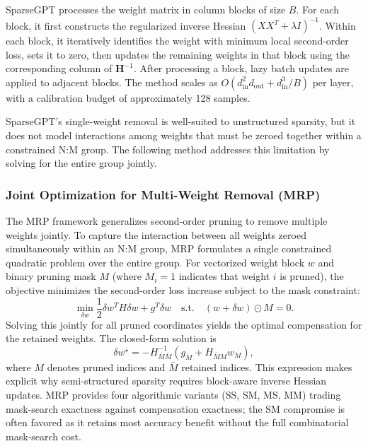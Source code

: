 SparseGPT processes the weight matrix in column blocks of size $B$. For each block, it first constructs the regularized inverse Hessian $(XX^T + \lambda I)^{-1}$. Within each block, it iteratively identifies the weight with minimum local second-order loss, sets it to zero, then updates the remaining weights in that block using the corresponding column of $\mathbf{H}^{-1}$. After processing a block, lazy batch updates are applied to adjacent blocks. The method scales as $O(d_{\text{in}}^2 d_{\text{out}} + d_{\text{in}}^3/B)$ per layer, with a calibration budget of approximately 128 samples.

SparseGPT's single-weight removal is well-suited to unstructured sparsity, but it does not model interactions among weights that must be zeroed together within a constrained N:M group. The following method addresses this limitation by solving for the entire group jointly.

\subsubsection{Joint Optimization for Multi-Weight Removal (MRP)}

The MRP framework \cite{zhao2024pruning} generalizes second-order pruning to remove multiple weights jointly. To capture the interaction between all weights zeroed simultaneously within an N:M group, MRP formulates a single constrained quadratic problem over the entire group. For vectorized weight block $w$ and binary pruning mask $M$ (where $M_i=1$ indicates that weight $i$ is pruned), the objective minimizes the second-order loss increase subject to the mask constraint:
\begin{equation}\label{eq:ptp}
	\min_{\delta w} \frac{1}{2}\delta w^T H \delta w + g^T \delta w
	\quad\text{s.t.}\quad
	(w+\delta w)\odot M = 0.
\end{equation}
Solving this jointly for all pruned coordinates yields the optimal compensation for the retained weights. The closed-form solution is
\begin{equation}
	\delta w^\star = -H_{\bar{M}\bar{M}}^{-1}(g_{\bar{M}} + H_{\bar{M}M}w_M),
\end{equation}
where $M$ denotes pruned indices and $\bar{M}$ retained indices. This expression makes explicit why semi-structured sparsity requires block-aware inverse Hessian updates. MRP provides four algorithmic variants (SS, SM, MS, MM) trading mask-search exactness against compensation exactness; the SM compromise is often favored as it retains most accuracy benefit without the full combinatorial mask-search cost.

